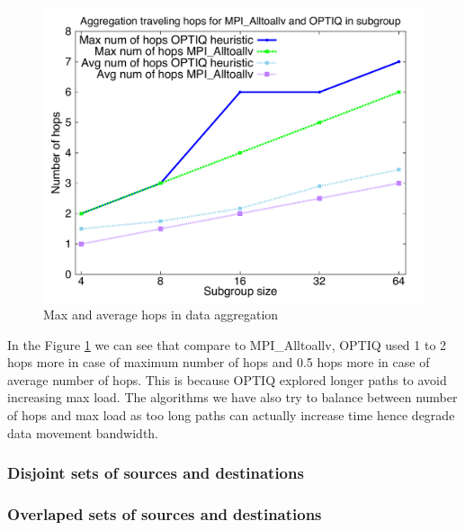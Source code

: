 \begin{figure}[!htb]
\vspace{-0.1in}
\centering
\includegraphics[scale=0.30]{figures/hop.pdf}
\vspace{-0.1in}
\caption{Max and average hops in data aggregation}
\vspace{-0.1in}
\label{fig:agghop}
\end{figure}

In the Figure \ref{fig:agghop} we can see that compare to MPI\_Alltoallv, OPTIQ used 1 to 2 hops more in case of maximum number of hops and 0.5 hops more in case of average number of hops. This is because OPTIQ explored longer paths to avoid increasing max load. The algorithms we have also try to balance between number of hops and max load as too long paths can actually increase time hence degrade data movement bandwidth.

\subsubsection{Disjoint sets of sources and destinations}

\subsubsection{Overlaped sets of sources and destinations}


